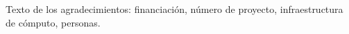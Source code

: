 %
%

\begin{acknowledgements}
  Texto de los agradecimientos: financiación, número de proyecto,
  infraestructura de cómputo, personas.
\end{acknowledgements}

